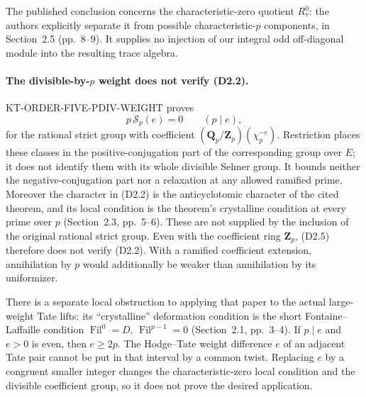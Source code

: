 The published conclusion concerns the characteristic-zero
quotient $R_\tau^0$: the authors explicitly separate it from
possible characteristic-$p$ components, in Section~2.5
(pp.~8--9).  It supplies no injection of our integral odd
off-diagonal module into the resulting trace algebra.

\paragraph{The divisible-by-$p$ weight does not verify (D2.2).}
KT-ORDER-FIVE-PDIV-WEIGHT proves
\[
 p\,\mathcal S_p(e)=0\qquad(p\mid e),                         \tag{D2.5}
\]
for the rational strict group with coefficient
$(\mathbf Q_p/\mathbf Z_p)(\chi_p^{-e})$.
Restriction places these classes in the positive-conjugation
part of the corresponding group over $E$; it does not identify
them with its whole divisible Selmer group.  It bounds neither
the negative-conjugation part nor a relaxation at any allowed
ramified prime.  Moreover the character in (D2.2) is the
anticyclotomic character of the cited theorem, and its local
condition is the theorem's crystalline condition at every
prime over $p$ (Section~2.3, pp.~5--6).  These are not supplied
by the inclusion of the original rational strict group.
Even with the coefficient ring $\mathbf Z_p$, (D2.5) therefore
does not verify (D2.2).  With a ramified coefficient extension,
annihilation by $p$ would additionally be weaker than
annihilation by its uniformizer.

There is a separate local obstruction to applying that paper to
the actual large-weight Tate lifts: its ``crystalline'' deformation
condition is the short Fontaine--Laffaille condition
$\operatorname{Fil}^0=D$, $\operatorname{Fil}^{p-1}=0$
(Section~2.1, pp.~3--4).  If $p\mid e$ and $e>0$ is even, then
$e\geq2p$.  The Hodge--Tate weight difference $e$ of an adjacent
Tate pair cannot be put in that interval by a common twist.
Replacing $e$ by a congruent smaller integer changes the
characteristic-zero local condition and the divisible
coefficient group, so it does not prove the desired application.

